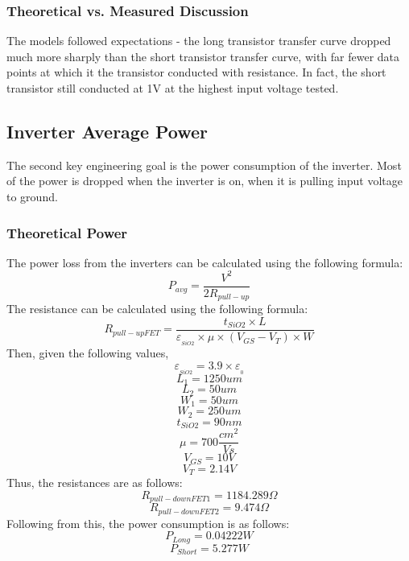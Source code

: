 \documentclass[12pt]{article}
\begin{document}
\subsubsection{Theoretical vs. Measured Discussion}
The models followed expectations - the long transistor transfer curve dropped much more sharply than the short transistor transfer curve, with far fewer data points at which it the transistor conducted with resistance. In fact, the short transistor still conducted at 1V at the highest input voltage tested.

\subsection{Inverter Average Power}
The second key engineering goal is the power consumption of the inverter. Most of the power is dropped when the inverter is on, when it is pulling input voltage to ground.

\subsubsection{Theoretical Power}
The power loss from the inverters can be calculated using the following formula:
\[P_{avg} = \frac{V^2}{2R_{pull-up}} \]
The resistance can be calculated using the following formula:
\[R_{pull-up FET} = \frac{t_{SiO2} \times L} {\varepsilon_{_{SiO2}} \times \mu \times (V_{GS} - V_T) \times W} \]
Then, given the following values,
\[\varepsilon_{_{SiO2}} = 3.9 \times \varepsilon_{_0} \]
\[L_1 = 1250um\]
\[L_2 = 50um\]
\[W_1 = 50um\]
\[W_2 = 250um\]
\[t_{SiO2} = 90nm \]
\[\mu = 700\frac{cm^2}{Vs} \]
\[V_{GS} = 10V \]
\[V_T = 2.14V \]
Thus, the resistances are as follows:
\[R_{pull-down FET 1} = 1184.289\Omega\]
\[R_{pull-down FET 2} = 9.474\Omega\]
Following from this, the power consumption is as follows:
\[P_{Long} = 0.04222W\]
\[P_{Short} = 5.277W\]
\end{document}
